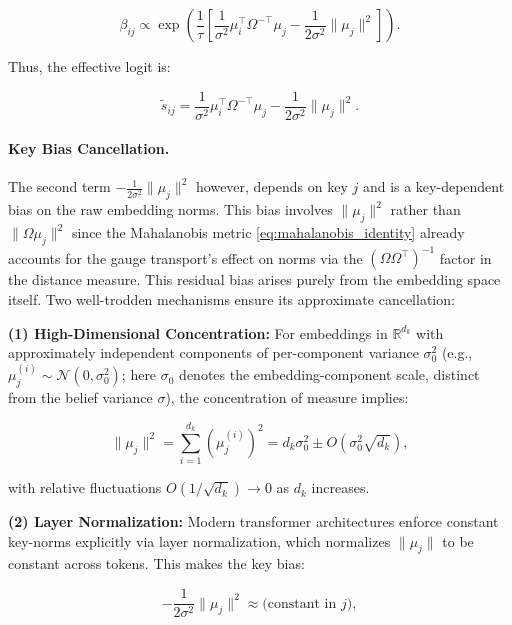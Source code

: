 \documentclass[twoside,11pt]{article}
\begin{document}
\begin{equation}
\beta_{ij} \propto \exp\left(\frac{1}{\tau}\left[\frac{1}{\sigma^2}\mu_i^\top\Omega^{-\top}\mu_j - \frac{1}{2\sigma^2}\|\mu_j\|^2\right]\right).
\end{equation}

Thus, the effective logit is:

\begin{equation}
\tilde{s}_{ij} = \frac{1}{\sigma^2}\mu_i^\top\Omega^{-\top}\mu_j - \frac{1}{2\sigma^2}\|\mu_j\|^2.
\end{equation}

\paragraph{Key Bias Cancellation.}

The second term $-\frac{1}{2\sigma^2}\|\mu_j\|^2$ however, depends on key $j$ and is a key-dependent bias on the raw embedding norms. This bias involves $\|\mu_j\|^2$ rather than $\|\Omega\mu_j\|^2$ since the Mahalanobis metric \eqref{eq:mahalanobis_identity} already accounts for the gauge transport's effect on norms via the $(\Omega\Omega^\top)^{-1}$ factor in the distance measure. This residual bias arises purely from the embedding space itself. Two well-trodden mechanisms ensure its approximate cancellation:

\textbf{(1) High-Dimensional Concentration:}
For embeddings in $\mathbb{R}^{d_k}$ with approximately independent components of per-component variance $\sigma_0^2$ (e.g., $\mu_j^{(i)} \sim \mathcal{N}(0, \sigma_0^2)$; here $\sigma_0$ denotes the embedding-component scale, distinct from the belief variance $\sigma$), the concentration of measure implies:

\begin{equation}
\|\mu_j\|^2 = \sum_{i=1}^{d_k} (\mu_j^{(i)})^2 = d_k\sigma_0^2 \pm O(\sigma_0^2\sqrt{d_k}),
\end{equation}

with relative fluctuations $O(1/\sqrt{d_k}) \to 0$ as $d_k$ increases.

\textbf{(2) Layer Normalization:}
Modern transformer architectures enforce constant key-norms explicitly via layer normalization, which normalizes $\|\mu_j\|$ to be constant across tokens. This makes the key bias:

\begin{equation}
-\frac{1}{2\sigma^2}\|\mu_j\|^2 \approx  \text{(constant in } j\text{)},
\end{equation}
\end{document}

